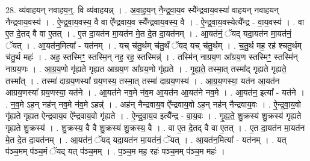 \documentclass[17pt]{extarticle}
\begin{document}
28. व्य॑वाहयन् नवाहय॒न्॒. वि व्य॑वाहयन्न् । . अ॒वा॒ह॒य॒न् नै॒न्द्र॒वा॒य॒व स्यै᳚न्द्रवाय॒वस्या॑ वाहयन् नवाहयन् नैन्द्रवाय॒वस्य॑ । . ऐ॒न्द्र॒वा॒य॒वस्य॒ वै वा ऐ᳚न्द्रवाय॒व स्यै᳚न्द्रवाय॒वस्य॒ वै । . ऐ॒न्द्र॒वा॒य॒वस्येत्यै᳚न्द्र - वा॒य॒वस्य॑ । . वा ए॒त दे॒तद् वै वा ए॒तत् । . ए॒त दा॒यत॑न मा॒यत॑न मे॒त दे॒त दा॒यत॑नम् । . आ॒यत॑नं॒ ॅयद् यदा॒यत॑न मा॒यत॑नं॒ ॅयत् । . आ॒यत॑न॒मित्या᳚ - यत॑नम् । . यच् च॑तु॒र्थम् च॑तु॒र्थं ॅयद् यच् च॑तु॒र्थम् । . च॒तु॒र्थ मह॒ रह॑ श्चतु॒र्थम् च॑तु॒र्थ महः॑ । . अह॒ स्तस्मिꣳ॒॒ स्तस्मि॒न् नह॒ रह॒ स्तस्मिन्न्॑ । . तस्मि॑न् नाग्रय॒ण आ᳚ग्रय॒ण स्तस्मिꣳ॒॒ स्तस्मि॑न् नाग्रय॒णः । . आ॒ग्र॒य॒णो गृ॑ह्यते गृह्यत आग्रय॒ण आ᳚ग्रय॒णो गृ॑ह्यते । . गृ॒ह्य॒ते॒ तस्मा॒त् तस्मा᳚द् गृह्यते गृह्यते॒ तस्मा᳚त् । . तस्मा॑ दाग्रय॒णस्या᳚ ग्रय॒णस्य॒ तस्मा॒त् तस्मा॑ दाग्रय॒णस्य॑ । . आ॒ग्र॒य॒णस्या॒ यत॑न आ॒यत॑न आग्रय॒णस्या᳚ ग्रय॒णस्या॒ यत॑ने । . आ॒यत॑ने नव॒मे न॑व॒म आ॒यत॑न आ॒यत॑ने नव॒मे । . आ॒यत॑न॒ इत्या᳚ - यत॑ने । . न॒व॒मे ऽह॒न् नह॑न् नव॒मे न॑व॒मे ऽहन्न्॑ । . अह॑न् नैन्द्रवाय॒व ऐ᳚न्द्रवाय॒वो ऽह॒न् नह॑न् नैन्द्रवाय॒वः । . ऐ॒न्द्र॒वा॒य॒वो गृ॑ह्यते गृह्यत ऐन्द्रवाय॒व ऐ᳚न्द्रवाय॒वो गृ॑ह्यते । . ऐ॒न्द्र॒वा॒य॒व इत्यै᳚न्द्र - वा॒य॒वः । . गृ॒ह्य॒ते॒ शु॒क्रस्य॑ शु॒क्रस्य॑ गृह्यते गृह्यते शु॒क्रस्य॑ । . शु॒क्रस्य॒ वै वै शु॒क्रस्य॑ शु॒क्रस्य॒ वै । . वा ए॒त दे॒तद् वै वा ए॒तत् । . ए॒त दा॒यत॑न मा॒यत॑न मे॒त दे॒त दा॒यत॑नम् । . आ॒यत॑नं॒ ॅयद् यदा॒यत॑न मा॒यत॑नं॒ ॅयत् । . आ॒यत॑न॒मित्या᳚ - यत॑नम् । . यत् प॑ञ्च॒मम् प॑ञ्च॒मं ॅयद् यत् प॑ञ्च॒मम् । . प॒ञ्च॒म मह॒ रहः॑ पञ्च॒मम् प॑ञ्च॒म महः॑ । \newline
\end{document}

